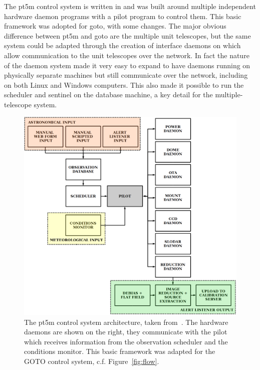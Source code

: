 \begin{colsection}
\begin{colsection}
The \gls{pt5m} control system is written in  and was built around multiple independent hardware daemon programs with a pilot program to control them. This basic framework was adopted for \gls{goto}, with some changes. The major obvious difference between \gls{pt5m} and \gls{goto} are the multiple unit telescopes, but the same system could be adapted through the creation of interface daemons on which allow communication to the unit telescopes over the network. In fact the nature of the daemon system made it very easy to expand to have daemons running on physically separate machines but still communicate over the network, including on both Linux and Windows computers. This also made it possible to run the scheduler and sentinel on the database machine, a key detail for the multiple-telescope system.

\begin{figure}[p]
\begin{center}
\includegraphics[width=\linewidth]{images/pt5m_software.png}
\end{center}
\caption[The pt5m control system architecture]{The \gls{pt5m} control system architecture, taken from~\cite{pt5m}. The hardware daemons are shown on the right, they communicate with the pilot which receives information from the observation scheduler and the conditions monitor. This basic framework was adapted for the GOTO control system, c.f. Figure~\ref{fig:flow}.}
\label{fig:pt5m_software}
\end{figure}

\end{colsection}


\end{colsection}

